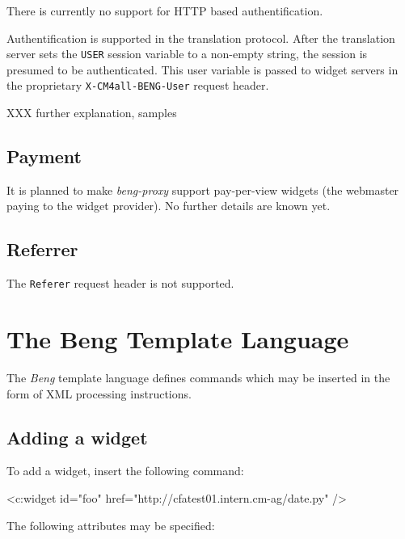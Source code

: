 \documentclass[a4paper,12pt]{article}
\begin{document}
There is currently no support for HTTP based authentification.

Authentification is supported in the translation protocol.  After the
translation server sets the \texttt{USER} session variable to a
non-empty string, the session is presumed to be authenticated.  This
user variable is passed to widget servers in the proprietary
\texttt{X-CM4all-BENG-User} request header.

XXX further explanation, samples


\subsection{Payment}

It is planned to make \emph{beng-proxy} support pay-per-view widgets
(the webmaster paying to the widget provider).  No further details are
known yet.


\subsection{Referrer}

The \texttt{Referer} request header is not supported.


\section{The Beng Template Language}
\label{processor}

The \emph{Beng} template language defines commands which may be
inserted in the form of XML processing instructions.

\subsection{Adding a widget}

To add a widget, insert the following command:

\begin{verbatim*}
<c:widget id="foo" href="http://cfatest01.intern.cm-ag/date.py" />
\end{verbatim*}

The following attributes may be specified:
\end{document}
